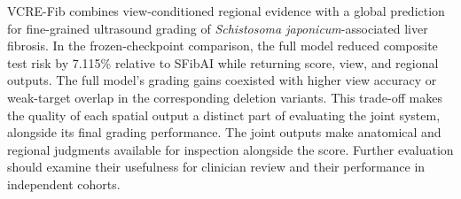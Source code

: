 VCRE-Fib combines view-conditioned regional evidence with a global prediction for fine-grained ultrasound grading of \emph{Schistosoma japonicum}-associated liver fibrosis. In the frozen-checkpoint comparison, the full model reduced composite test risk by 7.115\% relative to SFibAI while returning score, view, and regional outputs. The full model's grading gains coexisted with higher view accuracy or weak-target overlap in the corresponding deletion variants. This trade-off makes the quality of each spatial output a distinct part of evaluating the joint system, alongside its final grading performance. The joint outputs make anatomical and regional judgments available for inspection alongside the score. Further evaluation should examine their usefulness for clinician review and their performance in independent cohorts.
